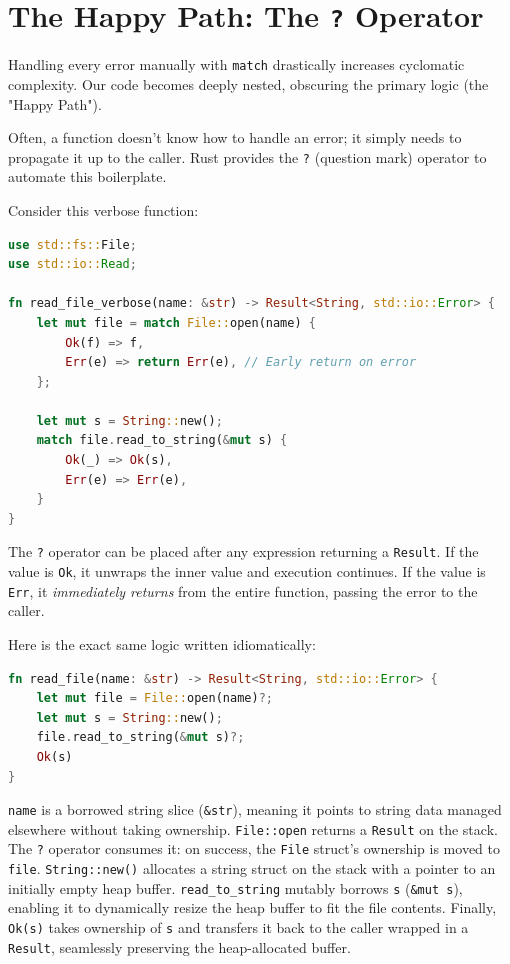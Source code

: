 \section{The Happy Path: The \texttt{?} Operator}

Handling every error manually with \texttt{match} drastically increases cyclomatic complexity. Our code becomes deeply nested, obscuring the primary logic (the "Happy Path"). 

Often, a function doesn't know how to handle an error; it simply needs to propagate it up to the caller. Rust provides the \texttt{?} (question mark) operator to automate this boilerplate.

Consider this verbose function:

\begin{lstlisting}[language=Rust]
use std::fs::File;
use std::io::Read;

fn read_file_verbose(name: &str) -> Result<String, std::io::Error> {
    let mut file = match File::open(name) {
        Ok(f) => f,
        Err(e) => return Err(e), // Early return on error
    };
    
    let mut s = String::new();
    match file.read_to_string(&mut s) {
        Ok(_) => Ok(s),
        Err(e) => Err(e),
    }
}
\end{lstlisting}

The \texttt{?} operator can be placed after any expression returning a \texttt{Result}. If the value is \texttt{Ok}, it unwraps the inner value and execution continues. If the value is \texttt{Err}, it \emph{immediately returns} from the entire function, passing the error to the caller.

Here is the exact same logic written idiomatically:

\begin{lstlisting}[language=Rust]
fn read_file(name: &str) -> Result<String, std::io::Error> {
    let mut file = File::open(name)?;
    let mut s = String::new();
    file.read_to_string(&mut s)?;
    Ok(s)
}
\end{lstlisting}

\begin{memoryblock}
\texttt{name} is a borrowed string slice (\texttt{\&str}), meaning it points to string data managed elsewhere without taking ownership. \texttt{File::open} returns a \texttt{Result} on the stack. The \texttt{?} operator consumes it: on success, the \texttt{File} struct's ownership is moved to \texttt{file}. \texttt{String::new()} allocates a string struct on the stack with a pointer to an initially empty heap buffer. \texttt{read\_to\_string} mutably borrows \texttt{s} (\texttt{\&mut s}), enabling it to dynamically resize the heap buffer to fit the file contents. Finally, \texttt{Ok(s)} takes ownership of \texttt{s} and transfers it back to the caller wrapped in a \texttt{Result}, seamlessly preserving the heap-allocated buffer.
\end{memoryblock}

